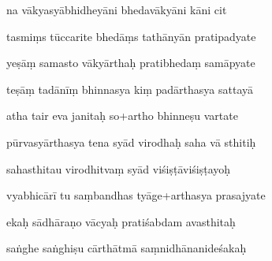 \documentclass[article,12pt,a4paper]{memoir}%
\newcounter{parCount}
\begin{document}
	  
	  \pstart {} na vākyasyābhidheyāni bhedavākyāni kāni cit 
	{}
	\pend%
      

	  
	  \pstart \leavevmode%
	tasmiṃs tūccarite bhedāṃs tathānyān pratipadyate 
	{}
	\pend%
      

	  
	  \pstart {} yeṣāṃ samasto vākyārthaḥ pratibhedaṃ samāpyate 
	{}
	\pend%
      

	  
	  \pstart \leavevmode%
	teṣāṃ tadānīṃ bhinnasya kiṃ padārthasya sattayā 
	{}
	\pend%
      

	  
	  \pstart {} atha tair eva janitaḥ so+artho bhinneṣu vartate 
	{}
	\pend%
      

	  
	  \pstart \leavevmode%
	pūrvasyārthasya tena syād virodhaḥ saha vā sthitiḥ 
	{}
	\pend%
      

	  
	  \pstart {} sahasthitau virodhitvaṃ syād viśiṣṭāviśiṣṭayoḥ 
	{}
	\pend%
      

	  
	  \pstart \leavevmode%
	vyabhicārī tu saṃbandhas tyāge+arthasya prasajyate 
	{}
	\pend%
      

	  
	  \pstart {} ekaḥ sādhāraṇo vācyaḥ pratiśabdam avasthitaḥ 
	{}
	\pend%
      

	  
	  \pstart \leavevmode%
	saṅghe saṅghiṣu cārthātmā saṃnidhānanideśakaḥ 
	{}
	\pend%
      
\end{document}
